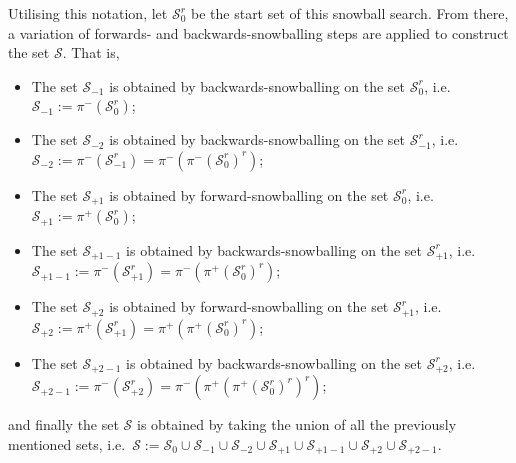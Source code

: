 \documentclass[11pt,a4paper]{book}
\theoremstyle{definition}
\theoremstyle{definition}
\theoremstyle{definition}
\theoremstyle{remark}
\newcommand{\tpset}{\mathcal{S}}
\newcommand{\tpsetz}{\mathcal{S}_{\mathit{0}}}
\newcommand{\pset}{S}
\newcommand{\psetz}{S_{\mathit{0}}}
\newcommand{\xset}{\mathcal{S}}
\newcommand{\xsetz}{\mathcal{S}_{\mathit{0}}}
\newcommand{\xsetb}{\mathcal{S}_{\mathit{-1}}}
\newcommand{\xsetbb}{\mathcal{S}_{\mathit{-2}}}
\newcommand{\xsetf}{\mathcal{S}_{\mathit{+1}}}
\newcommand{\xsetff}{\mathcal{S}_{\mathit{+2}}}
\newcommand{\xsetfb}{\mathcal{S}_{\mathit{+1-1}}}
\newcommand{\xsetffb}{\mathcal{S}_{\mathit{+2-1}}}
\newcommand{\npset}{\overline{\pset}}
\newcommand{\npsetz}{\overline{\psetz}}
\begin{document}
Utilising this notation, let $\xsetz^r$ be the start set of this snowball search. 
From there, a variation of forwards- and backwards-snowballing steps are applied to construct the set $\xset$. That is, 
%
\begin{itemize}
\item The set $\xsetb$ is obtained by backwards-snowballing on the set $\xsetz^r$, i.e.\ $\xsetb:=\pi^-(\xsetz^r)$;
\item The set $\xsetbb$ is obtained by backwards-snowballing on the set $\xsetb^r$, i.e.\ $\xsetbb:= \pi^-(\xsetb^r)=\pi^-(\pi^-(\xsetz^r)^r)$;
\item The set $\xsetf$ is obtained by forward-snowballing on the set $\xsetz^r$, i.e.\ $\xsetf:= \pi^+(\xsetz^r)$;
\item The set $\xsetfb$ is obtained by backwards-snowballing on the set $\xsetf^r$, i.e.\ $\xsetfb:= \pi^-(\xsetf^r)=\pi^-(\pi^+(\xsetz^r)^r)$;
\item The set $\xsetff$ is obtained by forward-snowballing on the set $\xsetf^r$, i.e.\ $\xsetff:= \pi^+(\xsetf^r)= \pi^+(\pi^+(\xsetz^r)^r)$;
\item The set $\xsetffb$ is obtained by backwards-snowballing on the set $\xsetff^r$, i.e.\  $\xsetffb:= \pi^-(\xsetff^r)=\pi^-(\pi^+(\pi^+(\xsetz^r)^r)^r)$;
\end{itemize}
and finally the set $\xset$ is obtained by taking the union of all the previously mentioned sets, i.e.\ $\xset := \xsetz \cup \xsetb \cup \xsetbb  \cup \xsetf  \cup \xsetfb  \cup \xsetff \cup \xsetffb$.
\end{document}
